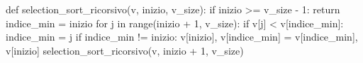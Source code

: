 \begin{unipdcode}[language=Python]
def selection_sort_ricorsivo(v, inizio, v_size):
    if inizio >= v_size - 1:
        return
    indice_min = inizio
    for j in range(inizio + 1, v_size):
        if v[j] < v[indice_min]:
            indice_min = j
    if indice_min != inizio:
        v[inizio], v[indice_min] = v[indice_min], v[inizio]
    selection_sort_ricorsivo(v, inizio + 1, v_size)
\end{unipdcode}
